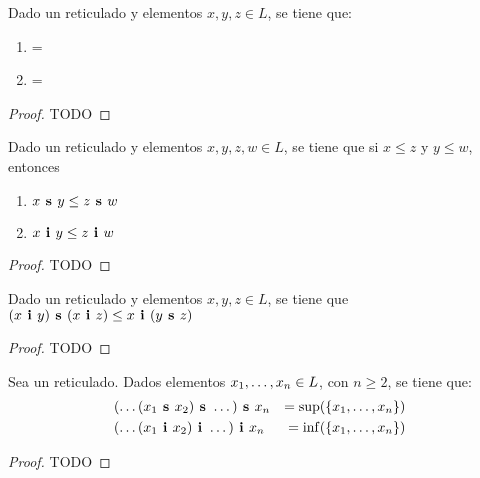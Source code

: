 \begin{lemma}
  Dado un reticulado \reticul y elementos $x, y, z \in L$, se tiene que:
  \begin{enumerate}
    \item {} = 
    \item {} = 
  \end{enumerate}
\end{lemma}
\begin{proof}
  TODO
\end{proof}

\begin{lemma}
  Dado un reticulado \reticul y elementos $x, y, z, w \in L$, se tiene que
  si $x \leq z$ y $y \leq w$, entonces
  \begin{enumerate}
    \item $x\textbf{ s }y \leq z\textbf{ s }w$
    \item $x\textbf{ i }y \leq z\textbf{ i }w$
  \end{enumerate}
\end{lemma}
\begin{proof}
  TODO
\end{proof}
\begin{lemma}
  Dado un reticulado \reticul y elementos $x, y, z \in L$, se tiene que\\
  $(x\textbf{ i }y)\textbf{ s }(x\textbf{ i }z) \leq x\textbf{ i }(y\textbf{ s }z)$
\end{lemma}
\begin{proof}
  TODO
\end{proof}
\begin{lemma}
  Sea \reticul un reticulado. Dados elementos $x_{1}, \dots, x_{n} \in L$, con $n \geq 2$,
  se tiene que:
  \begin{alignat}{2}
    &(\dots(x_1\textbf{ s }x_2)\textbf{ s }\dots)\textbf{ s }x_n &= \sup({\{x_{1}, \dots, x_{n}}\})\\
    &(\dots(x_1\textbf{ i }x_2)\textbf{ i }\dots)\textbf{ i }x_n &= \inf({\{x_{1}, \dots, x_{n}}\})        
  \end{alignat}
\end{lemma}
\begin{proof}
  TODO
\end{proof}
